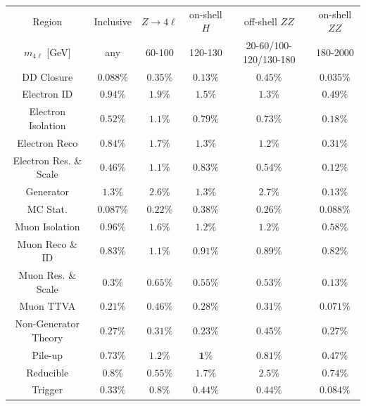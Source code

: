 \begin{table}
    \centering 
     \begin{tabular} {c  c  c  c  c  c }
         \hline 
         Region  & Inclusive   & $Z\rightarrow 4\ell$   & on-shell $H$   & off-shell $ZZ$   & on-shell $ZZ$   \\
         $m_{4\ell}$ [GeV]  & any   & 60-100   & 120-130   & 20-60/100-120/130-180   & 180-2000   \\
         \hline 
        DD Closure &  $ 0.088\% $  &  $ 0.35\% $  &  $ 0.13\% $  &  $ 0.45\% $  &  $ 0.035\% $ \\
        Electron ID &  $ 0.94\% $  &  $ \mathbf{1.9}\% $  &  $ \mathbf{1.5}\% $  &  $ \mathbf{1.3}\% $  &  $ 0.49\% $ \\
        Electron Isolation &  $ 0.52\% $  &  $ \mathbf{1.1}\% $  &  $ 0.79\% $  &  $ 0.73\% $  &  $ 0.18\% $ \\
        Electron Reco &  $ 0.84\% $  &  $ \mathbf{1.7}\% $  &  $ \mathbf{1.3}\% $  &  $ \mathbf{1.2}\% $  &  $ 0.31\% $ \\
        Electron Res. \& Scale &  $ 0.46\% $  &  $ \mathbf{1.1}\% $  &  $ 0.83\% $  &  $ 0.54\% $  &  $ 0.12\% $ \\
        Generator &  $ \mathbf{1.3}\% $  &  $ \mathbf{2.6}\% $  &  $ \mathbf{1.3}\% $  &  $ \mathbf{2.7}\% $  &  $ 0.13\% $ \\
        MC Stat. &  $ 0.087\% $  &  $ 0.22\% $  &  $ 0.38\% $  &  $ 0.26\% $  &  $ 0.088\% $ \\
        Muon Isolation &  $ 0.96\% $  &  $ \mathbf{1.6}\% $  &  $ \mathbf{1.2}\% $  &  $ \mathbf{1.2}\% $  &  $ 0.58\% $ \\
        Muon Reco \& ID &  $ 0.83\% $  &  $ \mathbf{1.1}\% $  &  $ 0.91\% $  &  $ 0.89\% $  &  $ 0.82\% $ \\
        Muon Res. \& Scale &  $ 0.3\% $  &  $ 0.65\% $  &  $ 0.55\% $  &  $ 0.53\% $  &  $ 0.13\% $ \\
        Muon TTVA &  $ 0.21\% $  &  $ 0.46\% $  &  $ 0.28\% $  &  $ 0.31\% $  &  $ 0.071\% $ \\
        Non-Generator Theory &  $ 0.27\% $  &  $ 0.31\% $  &  $ 0.23\% $  &  $ 0.45\% $  &  $ 0.27\% $ \\
        Pile-up &  $ 0.73\% $  &  $ \mathbf{1.2}\% $  &  $ \mathbf{1}\% $  &  $ 0.81\% $  &  $ 0.47\% $ \\
        Reducible &  $ 0.8\% $  &  $ 0.55\% $  &  $ \mathbf{1.7}\% $  &  $ \mathbf{2.5}\% $  &  $ 0.74\% $ \\
        Trigger &  $ 0.33\% $  &  $ 0.8\% $  &  $ 0.44\% $  &  $ 0.44\% $  &  $ 0.084\% $ \\

\end{tabular}
\end{table}
